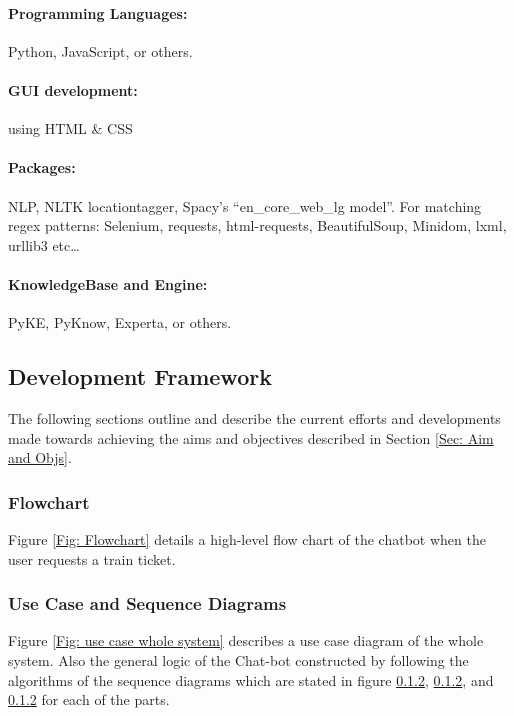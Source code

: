 \paragraph{Programming Languages:} Python, JavaScript, or others.
\paragraph{GUI development:} using HTML \& CSS 
\paragraph{Packages:} NLP, NLTK locationtagger\citep{NLTK}, Spacy's ``en\_core\_web\_lg model''. For matching regex patterns: Selenium, requests, html-requests, BeautifulSoup, Minidom, lxml, urllib3 etc\dots %
\paragraph{KnowledgeBase and Engine:} PyKE, PyKnow, Experta, or others. 
 
\subsection{Development Framework}
The following sections outline and describe the current efforts and developments made towards achieving the aims and objectives described in Section \ref{Sec: Aim and Objs}.

\subsubsection{Flowchart}
Figure \ref{Fig: Flowchart} details a high-level flow chart of the chatbot when the user requests a train ticket. 

\subsubsection{Use Case and Sequence Diagrams}
Figure \ref{Fig: use case whole system} describes a use case diagram of the whole system. Also the general logic of the Chat-bot constructed by following the algorithms of the sequence diagrams which are stated in figure \ref{}, \ref{}, and \ref{} for each of the parts.


